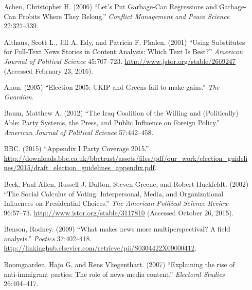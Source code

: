 \documentclass[12pt,article]{article}
\begin{document}
\singlespacing

\raggedright

\setlength\parindent{0pt}

Achen, Christopher H. (2006) ``Let's Put Garbage-Can Regressions and
Garbage-Can Probits Where They Belong.'' \emph{Conflict Management and
Peace Science} 22:327--339.

Althaus, Scott L., Jill A. Edy, and Patricia F. Phalen. (2001) ``Using
Substitutes for Full-Text News Stories in Content Analysis: Which Text
Is Best?'' \emph{American Journal of Political Science} 45:707--723.
\url{http://www.jstor.org/stable/2669247} (Accessed February 23, 2016).

Anon. (2005) ``Election 2005: UKIP and Greens fail to make gains.''
\emph{The Guardian}.

Baum, Matthew A. (2012) ``The Iraq Coalition of the Willing and
(Politically) Able: Party Systems, the Press, and Public Influence on
Foreign Policy.'' \emph{American Journal of Political Science}
57:442--458.

BBC. (2015) ``Appendix I Party Coverage 2015.''
\url{http://downloads.bbc.co.uk/bbctrust/assets/files/pdf/our_work/election_guidelines/2015/draft_election_guidelines_appendix.pdf}.

Beck, Paul Allen, Russell J. Dalton, Steven Greene, and Robert
Huckfeldt. (2002) ``The Social Calculus of Voting: Interpersonal, Media,
and Organizational Influences on Presidential Choices.'' \emph{The
American Political Science Review} 96:57--73.
\url{http://www.jstor.org/stable/3117810} (Accessed October 26, 2015).

Benson, Rodney. (2009) ``What makes news more multiperspectival? A field
analysis.'' \emph{Poetics} 37:402--418.
\url{http://linkinghub.elsevier.com/retrieve/pii/S0304422X09000412}.

Boomgaarden, Hajo G, and Rens Vliegenthart. (2007) ``Explaining the rise
of anti-immigrant parties: The role of news media content.''
\emph{Electoral Studies} 26:404--417.
\end{document}

